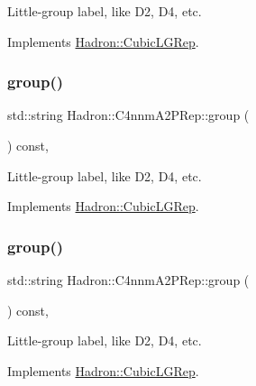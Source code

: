 Little-\/group label, like D2, D4, etc. 

Implements \mbox{\hyperlink{structHadron_1_1CubicLGRep_a9bdb14b519a611d21379ed96a3a9eb41}{Hadron\+::\+Cubic\+L\+G\+Rep}}.

\mbox{\label{structHadron_1_1C4nnmA2PRep_abf4767f07f1caa4e9cb8c3ab9629a640}} 
\subsubsection{\texorpdfstring{group()}{group()}\hspace{0.1cm}{\footnotesize\ttfamily [2/3]}}
{\footnotesize\ttfamily std\+::string Hadron\+::\+C4nnm\+A2\+P\+Rep\+::group (\begin{DoxyParamCaption}{ }\end{DoxyParamCaption}) const\hspace{0.3cm}{\ttfamily [inline]}, {\ttfamily [virtual]}}

Little-\/group label, like D2, D4, etc. 

Implements \mbox{\hyperlink{structHadron_1_1CubicLGRep_a9bdb14b519a611d21379ed96a3a9eb41}{Hadron\+::\+Cubic\+L\+G\+Rep}}.

\mbox{\label{structHadron_1_1C4nnmA2PRep_abf4767f07f1caa4e9cb8c3ab9629a640}} 
\subsubsection{\texorpdfstring{group()}{group()}\hspace{0.1cm}{\footnotesize\ttfamily [3/3]}}
{\footnotesize\ttfamily std\+::string Hadron\+::\+C4nnm\+A2\+P\+Rep\+::group (\begin{DoxyParamCaption}{ }\end{DoxyParamCaption}) const\hspace{0.3cm}{\ttfamily [inline]}, {\ttfamily [virtual]}}

Little-\/group label, like D2, D4, etc. 

Implements \mbox{\hyperlink{structHadron_1_1CubicLGRep_a9bdb14b519a611d21379ed96a3a9eb41}{Hadron\+::\+Cubic\+L\+G\+Rep}}.

\mbox{\label{structHadron_1_1C4nnmA2PRep_ab36717b439585aa0134698e1fa6802b2}} 
